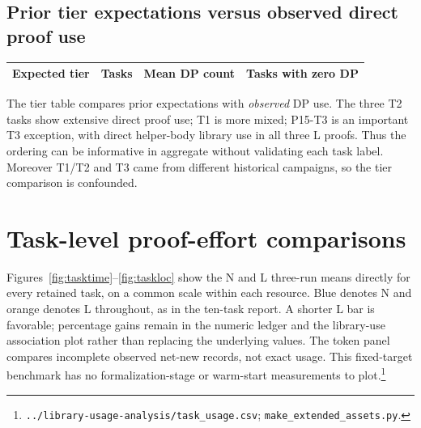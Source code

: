 \documentclass[10pt]{article}
\newcommand{\pathref}[1]{\nolinkurl{#1}}
\begin{document}
\subsection*{Prior tier expectations versus observed direct proof use}
\begin{center}\small
\begin{tabular}{@{}lrrr@{}}\toprule
Expected tier & Tasks & Mean DP count & Tasks with zero DP\\\midrule

\end{tabular}
\end{center}
The tier table compares prior expectations with \emph{observed} DP use.
The three T2 tasks show extensive direct proof use; T1 is more mixed;
P15-T3 is an important T3 exception, with direct helper-body library use
in all three L proofs. Thus the ordering can be informative in aggregate
without validating each task label. Moreover T1/T2 and T3 came from different
historical campaigns, so the tier comparison is confounded.

\section{Task-level proof-effort comparisons}
Figures~\ref{fig:tasktime}--\ref{fig:taskloc} show the N and L
three-run means directly for every retained task, on a common scale within
each resource. Blue denotes N and orange denotes L throughout, as in the
ten-task report. A shorter L bar is favorable; percentage gains remain in
the numeric ledger and the library-use association plot rather than
replacing the underlying values. The token panel compares incomplete
observed net-new records, not exact usage. This fixed-target benchmark has no
formalization-stage or warm-start measurements to plot.\footnote{\pathref{../library-usage-analysis/task_usage.csv};
\pathref{make_extended_assets.py}.}
\end{document}
